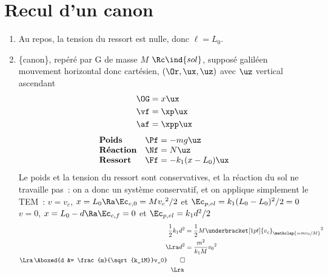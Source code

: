 \documentclass[a4paper, 12pt, final, garamond]{book}
\begin{document}
\section{Recul d'un canon}
\begin{enumerate}
    \item Au repos, la tension du ressort est nulle, donc $\ell = L_0$.
    \item 
        \begin{itemize}[label=$\diamond$, leftmargin=10pt]
             \{canon\}, repéré par G de masse $M$
             $\Rc\ind{sol}$, supposé galiléen
             mouvement horizontal donc cartésien, $(\Or,\ux,\uz)$
                avec $\uz$ vertical ascendant
                \begin{align*}
                    \OG &= x\ux\\
                    \vf &= \xp\ux\\
                    \af &= \xpp\ux
                \end{align*}
                \[
                    \begin{array}{ll}
                        \textbf{Poids} & \Pf = -mg\uz\\
                        \textbf{Réaction} & \Nf = N\uz\\
                        \textbf{Ressort} & \Ff = -k_1(x-L_0)\ux
                    \end{array}
                \]
                Le poids et la tension du ressort sont conservatives, et la
                réaction du sol ne travaille pas~: on a donc un système
                conservatif, et on applique simplement le TEM~:
             $v=v_c$, $x=L_0 \Ra \Ec_{c,0} =
                Mv_c{}^2/2$ et $\Ec_{p,el} = k_1(L_0-L_0)^2/2 = 0$
             $v=0$, $x=L_0-d \Ra \Ec_{c,f} = 0$ et
                $\Ec_{p, el} = k_1d^2/2$
                \begin{align*}
                    \frac{1}{2}k_1d^2 &=
                    \frac{1}{2}M\underbracket[1pt]{v_c}_{\mathclap{=mv_0/M}}{}^2
                    \\\Lra
                    d^2 &= \frac{m^2}{k_1M}v_0{}^2
                    \\\Lra\,
                    \Aboxed{d &= \frac{m}{\sqrt{k_1M}}v_0}
                    \qed
                    \\\Lra\,

\end{align*}
\end{itemize}
\end{enumerate}
\end{document}
